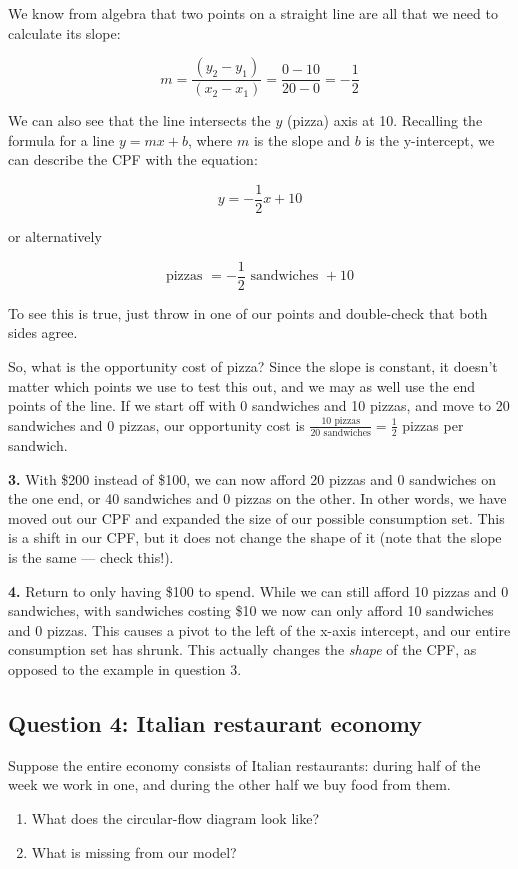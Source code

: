 \documentclass[12pt]{article}
\begin{document}
\medskip

We know from algebra that two points on a straight line are all that we need to calculate its slope:

$$
m = \dfrac{(y_2 - y_1)}{(x_2 - x_1)} = \dfrac{0 - 10}{20 - 0} = - \frac{1}{2}
$$

We can also see that the line intersects the $y$ (pizza) axis at 10. Recalling the formula for a line $y = mx + b$, where $m$ is the slope and $b$ is the y-intercept, we can describe the CPF with the equation:

$$
y = -\frac{1}{2}x + 10
$$

or alternatively

$$
\text{pizzas } = -\frac{1}{2} \text{ sandwiches } + 10
$$

To see this is true, just throw in one of our points and double-check that both sides agree.

\medskip

So, what is the opportunity cost of pizza? Since the slope is constant, it doesn't matter which points we use to test this out, and we may as well use the end points of the line. If we start off with 0 sandwiches and 10 pizzas, and move to 20 sandwiches and 0 pizzas, our opportunity cost is $\frac{10 \text{ pizzas}}{20 \text{ sandwiches}} = \frac{1}{2}$ pizzas per sandwich.

\medskip

\textbf{3.} With \$200 instead of \$100, we can now afford 20 pizzas and 0 sandwiches on the one end, or 40 sandwiches and 0 pizzas on the other. In other words, we have moved out our CPF and expanded the size of our possible consumption set. This is a shift in our CPF, but it does not change the shape of it (note that the slope is the same --- check this!).

\medskip

\textbf{4.} Return to only having \$100 to spend. While we can still afford 10 pizzas and 0 sandwiches, with sandwiches costing \$10 we now can only afford 10 sandwiches and 0 pizzas. This causes a pivot to the left of the x-axis intercept, and our entire consumption set has shrunk. This actually changes the \textit{shape} of the CPF, as opposed to the example in question 3.

\subsection*{Question 4: Italian restaurant economy}
Suppose the entire economy consists of Italian restaurants: during half of the week we work in one, and during the other half we buy food from them.
\begin{enumerate}
    \item What does the circular-flow diagram look like?
    \item What is missing from our model?
\end{enumerate}
\end{document}
